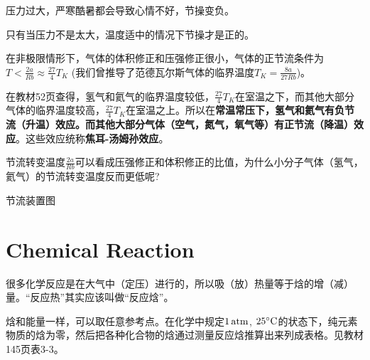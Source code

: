 \documentclass[CJK]{beamer}
\begin{document}
\begin{frame}
\bch
压力过大，严寒酷暑都会导致心情不好，节操变负。

只有当压力不是太大，温度适中的情况下节操才是正的。


\ech
\end{frame}



\begin{frame}
\bch

在非极限情形下，气体的体积修正和压强修正很小，气体的正节流条件为$T<\frac{2a}{Rb} \approx \frac{27}{4} T_K$ (我们曾推导了范德瓦尔斯气体的临界温度$T_K = \frac{8a}{27Rb}$)。

\skipline

在教材52页查得，氢气和氦气的临界温度较低，$\frac{27}{4} T_K$在室温之下，而其他大部分气体的临界温度较高，$\frac{27}{4} T_K$在室温之上。所以在{\bf 常温常压下，氢气和氦气有负节流（升温）效应。而其他大部分气体（空气，氮气，氧气等）有正节流（降温）效应}。这些效应统称{\bf 焦耳-汤姆孙效应}。
\ech
\end{frame}

\begin{frame}
\bch
{}

节流转变温度$\frac{2a}{Rb}$可以看成压强修正和体积修正的比值，为什么小分子气体（氢气，氦气）的节流转变温度反而更低呢?

\ech
\end{frame}




\begin{frame}
\bch
{}
\emini
{}
节流装置图
\emini

\ech
\end{frame}

\section{Chemical Reaction}

\begin{frame}
\bch
很多化学反应是在大气中（定压）进行的，所以吸（放）热量等于焓的增（减）量。“反应热”其实应该叫做“反应焓”。

\skiplines

焓和能量一样，可以取任意参考点。在化学中规定$1\,\mathrm{atm}$, $25^\circ \mathrm{C}$的状态下，纯元素物质的焓为零，然后把各种化合物的焓通过测量反应焓推算出来列成表格。见教材145页表3-3。

\ech
\end{frame}
\end{document}
